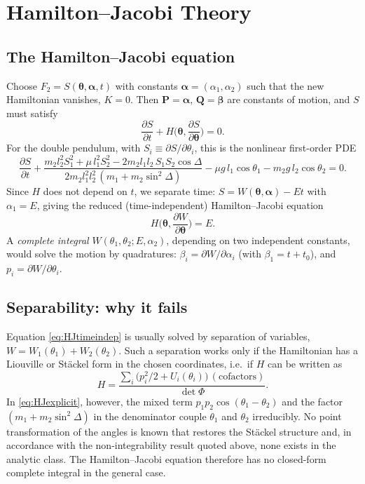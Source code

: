 \documentclass[11pt,a4paper]{book}
\theoremstyle{definition}
\theoremstyle{remark}
\begin{document}
\section{Hamilton--Jacobi Theory}
\label{sec:hj}

\subsection{The Hamilton--Jacobi equation}

Choose $F_2=S(\bm\theta,\bm\alpha,t)$ with constants $\bm\alpha=(\alpha_1,\alpha_2)$ such that the new Hamiltonian
vanishes, $K=0$. Then $\bm P=\bm\alpha$, $\bm Q=\bm\beta$ are constants of motion, and $S$ must satisfy
\begin{equation}
  \frac{\partial S}{\partial t}+H\Big(\bm\theta,\frac{\partial S}{\partial\bm\theta}\Big)=0 .
  \label{eq:HJ}
\end{equation}
For the double pendulum, with $S_i\equiv\partial S/\partial\theta_i$, this is the nonlinear first-order PDE
\begin{equation}
  \frac{\partial S}{\partial t}
  +\frac{m_2l_2^2S_1^2+\mu\,l_1^2S_2^2-2m_2l_1l_2\,S_1S_2\cos\Delta}{2m_2l_1^2l_2^2\,(m_1+m_2\sin^2\Delta)}
  -\mu g\,l_1\cos\theta_1-m_2g\,l_2\cos\theta_2=0 .
  \label{eq:HJexplicit}
\end{equation}
Since $H$ does not depend on $t$, we separate time: $S=W(\bm\theta,\bm\alpha)-Et$ with $\alpha_1=E$, giving the
reduced (time-independent) Hamilton--Jacobi equation
\begin{equation}
  H\Big(\bm\theta,\frac{\partial W}{\partial\bm\theta}\Big)=E .
  \label{eq:HJtimeindep}
\end{equation}
A \emph{complete integral} $W(\theta_1,\theta_2;E,\alpha_2)$, depending on two independent constants, would solve the
motion by quadratures: $\beta_i=\partial W/\partial\alpha_i$ (with $\beta_1=t+t_0$), and $p_i=\partial W/\partial\theta_i$.

\subsection{Separability: why it fails}

Equation \eqref{eq:HJtimeindep} is usually solved by separation of variables, $W=W_1(\theta_1)+W_2(\theta_2)$. Such a
separation works only if the Hamiltonian has a Liouville or St\"ackel form in the chosen coordinates, i.e.\ if
$H$ can be written as
\[
  H=\frac{\sum_i\big(p_i^2/2+U_i(\theta_i)\big)\,(\text{cofactors})}{\det\Phi}.
\]
In \eqref{eq:HJexplicit}, however, the mixed term $p_1p_2\cos(\theta_1-\theta_2)$ and the factor
$(m_1+m_2\sin^2\Delta)$ in the denominator couple $\theta_1$ and $\theta_2$ irreducibly. No point transformation of the
angles is known that restores the Stäckel structure and, in accordance with the non-integrability result quoted above, none
exists in the analytic class. The Hamilton--Jacobi equation therefore has no closed-form complete integral in the
general case.
\end{document}
